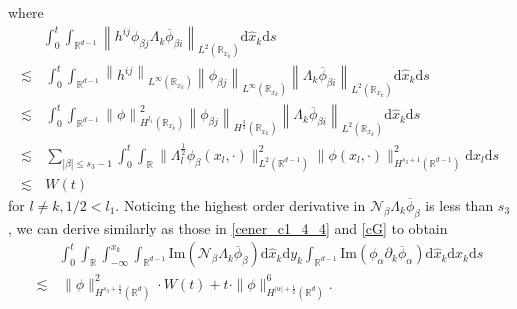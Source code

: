 \documentclass[10pt,twoside,a4paper]{article}
\numberwithin{equation}{section}\allowdisplaybreaks
\def\leq{\leqslant}
\begin{document}
where 
\begin{align*}
	&\int_0^t \int_{\mathbb{R}^{d-1}}    \left\|  h^{ij} \phi_{\beta j}\Lambda_k\overline{\phi}_{\beta i} \right\|_{L^2(\mathbb{R}_{x_k})}\mathrm{d} \hat{x}_k \mathrm{d} s\\
	\lesssim &\,\int_0^t \int_{\mathbb{R}^{d-1}}    \left\|  h^{ij} \right\|_{L^\infty(\mathbb{R}_{x_k})} \left\|  \phi_{\beta j} \right\|_{L^\infty(\mathbb{R}_{x_k})} \left\|  \Lambda_k\overline{\phi}_{\beta i}\right\|_{L^2(\mathbb{R}_{x_k})}\mathrm{d} \hat{x}_k \mathrm{d} s\\
	\lesssim&\, \int_0^t \int_{\mathbb{R}^{d-1}}    \left\| \phi \right\|_{H^
		{l_1}(\mathbb{R}_{x_k})}^2 \left\|  \phi_{\beta j} \right\|_{H^{\frac34}(\mathbb{R}_{x_k})} \left\|  \Lambda_k\overline{\phi}_{\beta i}\right\|_{L^2(\mathbb{R}_{x_k})}\mathrm{d} \hat{x}_k \mathrm{d} s\\
	\lesssim&\, \sum_{|\beta|\leq s_3-1}  \int_0^t	\int_{\mathbb{R}}   \| \Lambda_l^{\frac 12}\phi_{\beta}(x_l,\cdot)\|_{L^2(\mathbb{R}^{d-1})}^2  \|\phi (x_l,\cdot)\|^2_{H^{s_3+1}(\mathbb{R}^{d-1})}\mathrm{d} x_l \mathrm{d} s\\
	\lesssim &\,W(t)
\end{align*}
for $ l\neq k,  1/2<l_1. $
Noticing the highest order derivative in $ \mathcal{N}_\beta \Lambda_k\overline{\phi}_{\beta } $ is less than $ s_3 $, we can derive similarly as those in \eqref{cener_c1_4_4} and  \eqref{cG} to obtain
\begin{align} \label{cener_c1_4_5}
	&\int_0^t \int_{\mathbb{R}}  \int_{-\infty}^{x_k} \int_{\mathbb{R}^{d-1}}  \mathrm{Im} \left(  \mathcal{N}_\beta \Lambda_k\overline{\phi}_{\beta }\right)\mathrm{d} \hat{x}_k \mathrm{d} y_k \int_{\mathbb{R}^{d-1}}  \mathrm{Im}\left( \phi_{\alpha } \partial_k \overline{\phi}_\alpha \right) \mathrm{d} \hat{x}_k  \mathrm{d} x_k \mathrm{d} s \\
	\lesssim &\,\|\phi\|_{H^{s_3+\frac 12}(\mathbb{R}^d)}^2\cdot W (t)+t\cdot\|\phi\|_{H^{|\alpha|+\frac12}(\mathbb{R}^{d})}^6.\nonumber
\end{align}
\end{document}
